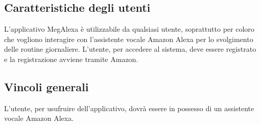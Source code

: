 \subsection{Caratteristiche degli utenti}
{
    L'applicativo MegAlexa è utilizzabile da qualsiasi utente, soprattutto per coloro che vogliono interagire con l'assistente vocale Amazon Alexa per lo svolgimento delle routine giornaliere.
    L'utente, per accedere al sistema, deve essere registrato e la registrazione avviene tramite Amazon. 
}


\subsection{Vincoli generali}
{
    L'utente, per usufruire dell'applicativo, dovrà essere in possesso di un assistente vocale Amazon Alexa.   
}